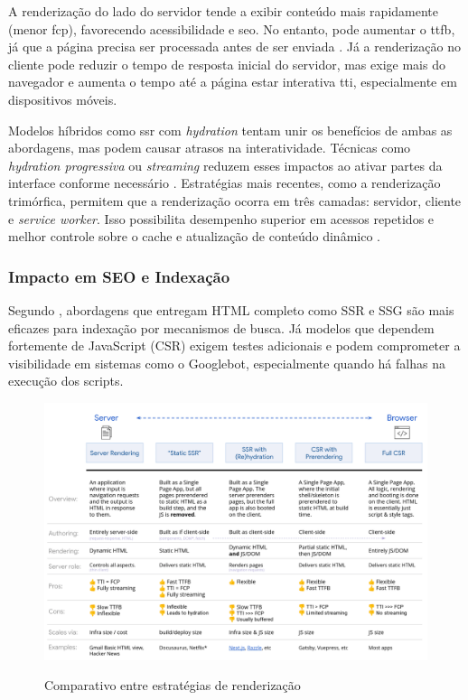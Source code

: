 A renderização do lado do servidor tende a exibir conteúdo mais rapidamente (menor \acrshort{fcp}), favorecendo acessibilidade e \acrshort{seo}. No entanto, pode aumentar o \acrshort{ttfb}, já que a página precisa ser processada antes de ser enviada \cite{osmani2025}. Já a renderização no cliente pode reduzir o tempo de resposta inicial do servidor, mas exige mais do navegador e aumenta o tempo até a página estar interativa \acrfull{tti}, especialmente em dispositivos móveis.

Modelos híbridos como \acrshort{ssr} com \textit{hydration} tentam unir os benefícios de ambas as abordagens, mas podem causar atrasos na interatividade. Técnicas como \textit{hydration progressiva} ou \textit{streaming} reduzem esses impactos ao ativar partes da interface conforme necessário \cite{osmani2025}. Estratégias mais recentes, como a renderização trimórfica, permitem que a renderização ocorra em três camadas: servidor, cliente e \textit{service worker}. Isso possibilita desempenho superior em acessos repetidos e melhor controle sobre o cache e atualização de conteúdo dinâmico \cite{osmani2025}.

\subsubsection{Impacto em SEO e Indexação}

Segundo , abordagens que entregam HTML completo como SSR e SSG são mais eficazes para indexação por mecanismos de busca. Já modelos que dependem fortemente de JavaScript (CSR) exigem testes adicionais e podem comprometer a visibilidade em sistemas como o Googlebot, especialmente quando há falhas na execução dos scripts.

\begin{figure}[H]
  \centering
  \caption{Comparativo entre estratégias de renderização}
  \includegraphics[width=\textwidth]{media/rendering_comparison_table.png}
  \label{fig:comparativo_renderizacao}
\end{figure}

